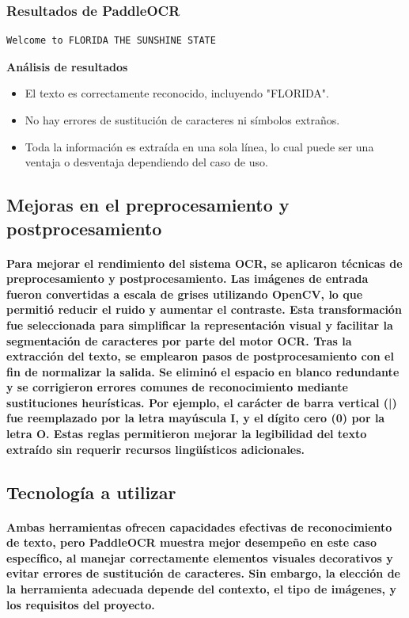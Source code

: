 \documentclass[conference]{IEEEtran}
\begin{document}
\subsubsection{Resultados de PaddleOCR}
\begin{verbatim}
Welcome to FLORIDA THE SUNSHINE STATE
\end{verbatim}
\textbf{Análisis de resultados}
\begin{itemize}
    \item El texto es correctamente reconocido, incluyendo "FLORIDA".
    \item No hay errores de sustitución de caracteres ni símbolos extraños.
    \item Toda la información es extraída en una sola línea, lo cual puede ser una ventaja o desventaja dependiendo del caso de uso.
\end{itemize}

\subsection{Mejoras en el preprocesamiento y postprocesamiento}
\paragraph{Para mejorar el rendimiento del sistema OCR, se aplicaron técnicas de preprocesamiento y postprocesamiento. Las imágenes de entrada fueron convertidas a escala de grises utilizando OpenCV, lo que permitió reducir el ruido y aumentar el contraste. Esta transformación fue seleccionada para simplificar la representación visual y facilitar la segmentación de caracteres por parte del motor OCR.
Tras la extracción del texto, se emplearon pasos de postprocesamiento con el fin de normalizar la salida. Se eliminó el espacio en blanco redundante y se corrigieron errores comunes de reconocimiento mediante sustituciones heurísticas. Por ejemplo, el carácter de barra vertical (|) fue reemplazado por la letra mayúscula I, y el dígito cero (0) por la letra O. Estas reglas permitieron mejorar la legibilidad del texto extraído sin requerir recursos lingüísticos adicionales.}

\subsection{Tecnología a utilizar}

\paragraph{Ambas herramientas ofrecen capacidades efectivas de reconocimiento de texto, pero PaddleOCR muestra mejor desempeño en este caso específico, al manejar correctamente elementos visuales decorativos y evitar errores de sustitución de caracteres. Sin embargo, la elección de la herramienta adecuada depende del contexto, el tipo de imágenes, y los requisitos del proyecto.}
\end{document}
